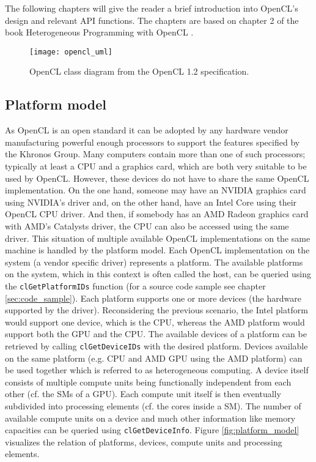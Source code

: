 The following chapters will give the reader a brief introduction into OpenCL's design and relevant API functions. The chapters are based on chapter 2 of the book Heterogeneous Programming with OpenCL \cite[p.15-31]{opencl_book}.

\begin{figure}
\centering
\texttt{[image: opencl\_uml]}
\caption{OpenCL class diagram from the OpenCL 1.2 specification. \cite{opencl_spec}}
\label{fig:opencl_uml}
\end{figure}

\subsection{Platform model}
As OpenCL is an open standard it can be adopted by any hardware vendor manufacturing powerful enough processors to support the features specified by the Khronos Group. Many computers contain more than one of such processors; typically at least a CPU and a graphics card, which are both very suitable to be used by OpenCL. However, these devices do not have to share the same OpenCL implementation. On the one hand, someone may have an NVIDIA graphics card using NVIDIA's driver and, on the other hand, have an Intel Core using their OpenCL CPU driver. And then, if somebody has an AMD Radeon graphics card with AMD's Catalysts driver, the CPU can also be accessed using the same driver.
This situation of multiple available OpenCL implementations on the same machine is handled by the platform model. Each OpenCL implementation on the system (a vendor specific driver) represents a platform. The available platforms on the system, which in this context is often called the host, can be queried using the \lstinline!clGetPlatformIDs! function (for a source code sample see chapter \ref{sec:code_sample}).
Each platform supports one or more devices (the hardware supported by the driver). Reconsidering the previous scenario, the Intel platform would support one device, which is the CPU, whereas the AMD platform would support both the GPU and the CPU. The available devices of a platform can be retrieved by calling \lstinline!clGetDeviceIDs! with the desired platform. Devices available on the same platform (e.g. CPU and AMD GPU using the AMD platform) can be used together which is referred to as heterogeneous computing. 
A device itself consists of multiple compute units being functionally independent from each other (cf. the SMs of a GPU). Each compute unit itself is then eventually subdivided into processing elements (cf. the cores inside a SM). The number of available compute units on a device and much other information like memory capacities can be queried using \lstinline!clGetDeviceInfo!.
Figure \ref{fig:platform_model} visualizes the relation of platforms, devices, compute units and processing elements. \cite[p.19ff]{opencl_book}

